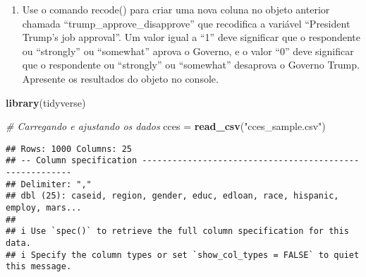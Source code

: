 \documentclass[
]{article}
\newenvironment{Shaded}{\begin{snugshade}}{\end{snugshade}}
\newcommand{\CommentTok}[1]{\textcolor[rgb]{0.56,0.35,0.01}{\textit{#1}}}
\newcommand{\FunctionTok}[1]{\textcolor[rgb]{0.13,0.29,0.53}{\textbf{#1}}}
\newcommand{\NormalTok}[1]{#1}
\newcommand{\OtherTok}[1]{\textcolor[rgb]{0.56,0.35,0.01}{#1}}
\newcommand{\StringTok}[1]{\textcolor[rgb]{0.31,0.60,0.02}{#1}}
\providecommand{\tightlist}{%
  \setlength{\itemsep}{0pt}\setlength{\parskip}{0pt}}
\begin{document}
\begin{enumerate}
\def\labelenumi{\arabic{enumi})}
\setcounter{enumi}{1}
\tightlist
\item
  Use o comando recode() para criar uma nova coluna no objeto anterior
  chamada ``trump\_approve\_disapprove'' que recodifica a variável
  ``President Trump's job approval''. Um valor igual a ``1'' deve
  significar que o respondente ou ``strongly'' ou ``somewhat'' aprova o
  Governo, e o valor ``0'' deve significar que o respondente ou
  ``strongly'' ou ``somewhat'' desaprova o Governo Trump. Apresente os
  resultados do objeto no console.
\end{enumerate}

\begin{Shaded}
\begin{Highlighting}[]
\FunctionTok{library}\NormalTok{(tidyverse)}

\CommentTok{\# Carregando e ajustando os dados}
\NormalTok{cces }\OtherTok{=} \FunctionTok{read\_csv}\NormalTok{(}\StringTok{"cces\_sample.csv"}\NormalTok{)}
\end{Highlighting}
\end{Shaded}

\begin{verbatim}
## Rows: 1000 Columns: 25
## -- Column specification --------------------------------------------------------
## Delimiter: ","
## dbl (25): caseid, region, gender, educ, edloan, race, hispanic, employ, mars...
## 
## i Use `spec()` to retrieve the full column specification for this data.
## i Specify the column types or set `show_col_types = FALSE` to quiet this message.
\end{verbatim}
\end{document}
